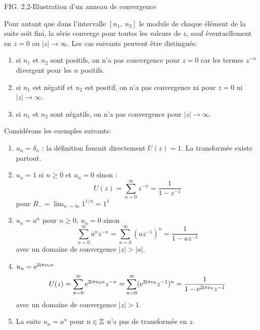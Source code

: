 FIG. 2.2-Illustration d'un anneau de convergence

Pour autant que dans l'intervalle $[n_{1},\ n_{2}]$ le module de chaque \'{e}l\'{e}ment de la suite soit fini, la s\'{e}rie converge pour toutes les valeurs de $z$, sauf \'{e}ventuellement en $z=0$ ou $|z|\rightarrow\infty$. Les cas suivants peuvent \^{e}tre distingu\'{e}s:
\begin{enumerate}
\item si $n_{1}$ et $n_{2}$ sont positifs, on n'a pas convergence pour $z=0$ car les termes $z^{-n}$ divergent pour les $n$ positifs.
\item  si $n_{1}$ est n\'{e}gatif et $n_{2}$ est positif, on n'a pas convergence ni pour $z=0$ ni $|z|\rightarrow\infty$.
\item si $n_{1}$ et $n_{2}$ sont n\'{e}gatifs, on n'a pas convergence pour $|z|\rightarrow\infty$.
\end{enumerate}
Consid\'{e}rons les exemples suivants:
\begin{enumerate}
\item $u_n=\delta_n$ : la d\'{e}finition fournit directement $U(z)=1$. La transform\'{e}e existe partout.
\item $u_n=1$ si $n \geq 0$ et $u_n=0$ sinon :
$$
U(z)=\sum_{n=0}^{\infty}z^{-n}=\frac{1}{1-z^{-1}}
$$
pour $R_{-}=\displaystyle \lim_{n\rightarrow\infty}1^{1/n}=1^{1}$
\item $u_n=a^{n}$ pour $n \geq 0$, $u_n=0$ sinon
\begin{equation}
\label{eq:z-exponentiel}
\sum_{n=0}^{\infty}a^{n}z^{-n}=\sum_{n=0}^{\infty}(az^{-1})^{n}=\frac{1}{1-az^{-1}}
\end{equation}
avec un domaine de convergence $|z|>|a|$.
\item $u_n = \mathrm{e}^{ 2 \mathrm{i} \pi \nu_0 n}$
$$
U(z)=\sum_{n=0}^{\infty}\mathrm{e}^{2 \mathrm{i} \pi \nu_0 n}z^{-n}=\sum_{n=0}^{\infty}( \mathrm{e}^{2 \mathrm{i} \pi \nu_0} z^{-1})^{n}=\frac{1}{1- \mathrm{e}^{2 \mathrm{i} \pi \nu_0} z^{-1}}
$$
avec un domaine de convergence $|z|>1$.
\item La suite $u_n= a^n$ pour $n \in \mathbb{Z}$ n'a pas de transformée en $z$.
\end{enumerate}
